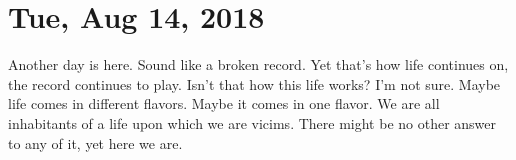 \section{Tue, Aug 14, 2018}

Another day is here. Sound like a broken record. Yet that's how life continues on,
the record continues to play. Isn't that how this life works? I'm not sure. Maybe
life comes in different flavors. Maybe it comes in one flavor. We are all inhabitants
of a life upon which we are vicims. There might be no other answer to any of it, yet
here we are.